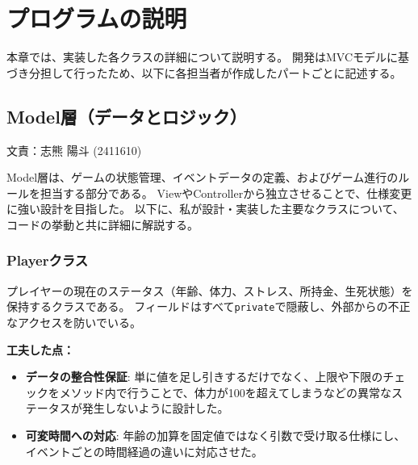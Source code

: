 \documentclass[a4paper,11pt]{jsarticle}
\begin{document}
\newpage

\section{プログラムの説明}

本章では、実装した各クラスの詳細について説明する。
開発はMVCモデルに基づき分担して行ったため、以下に各担当者が作成したパートごとに記述する。

\subsection{Model層（データとロジック）}
\begin{flushright}
文責：志熊 陽斗 (2411610)
\end{flushright}

Model層は、ゲームの状態管理、イベントデータの定義、およびゲーム進行のルールを担当する部分である。
ViewやControllerから独立させることで、仕様変更に強い設計を目指した。
以下に、私が設計・実装した主要なクラスについて、コードの挙動と共に詳細に解説する。

\subsubsection{Playerクラス}
プレイヤーの現在のステータス（年齢、体力、ストレス、所持金、生死状態）を保持するクラスである。
フィールドはすべて\texttt{private}で隠蔽し、外部からの不正なアクセスを防いでいる。

\textbf{工夫した点：}
\begin{itemize}
    \item \textbf{データの整合性保証}: 単に値を足し引きするだけでなく、上限や下限のチェックをメソッド内で行うことで、体力が100を超えてしまうなどの異常なステータスが発生しないように設計した。
    \item \textbf{可変時間への対応}: 年齢の加算を固定値ではなく引数で受け取る仕様にし、イベントごとの時間経過の違いに対応させた。
\end{itemize}
\end{document}
